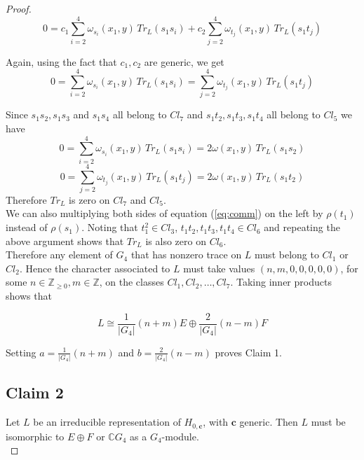 \documentclass[a4apper,10pt]{amsart}
\theoremstyle{definition}
\numberwithin{thm}{section}
\newcommand{\Z}{\mathbb{Z}}
\newcommand{\C}{\mathbb{C}}
\begin{document}
\begin{proof}
\begin{displaymath}
0 = c_1 \sum_{i = 2}^4 \omega_{s_i}(x_1,y) \, Tr_L(s_1s_i) + c_2 \sum_{j = 2}^4 \omega_{t_j} (x_1,y) \, Tr_L(s_1t_j)
\end{displaymath}

\noindent Again, using the fact that $c_1, c_2$ are generic, we get  
\begin{displaymath}
0 = \sum_{i = 2}^4 \omega_{s_i}(x_1,y) \, Tr_L(s_1s_i) = \sum_{j = 2}^4 \omega_{t_j}(x_1,y) \, Tr_L(s_1t_j) 
\end{displaymath}

\noindent Since $s_1s_2, s_1s_3$ and $s_1s_4$ all belong to $Cl_7$ and $s_1t_2, s_1t_3,s_1t_4$ all belong to $Cl_5$ we have 
\begin{displaymath}
0 = \sum_{i = 2}^4 \omega_{s_i}(x_1,y)\, Tr_L(s_1s_i) = 2 \omega(x_1,y) \, Tr_L(s_1s_2)
\end{displaymath}
\begin{displaymath}
0 = \sum_{j = 2}^4 \omega_{t_j}(x_1,y) \, Tr_L(s_1t_j) = 2 \omega(x_1,y) \, Tr_L(s_1t_2)
\end{displaymath}
Therefore $Tr_L$ is zero on $Cl_7$ and $Cl_5$.\\
We can also multiplying both sides of equation (\ref{eq:comm}) on the left by $\rho(t_1)$ instead of $\rho(s_1)$. Noting that $t_1^2 \in Cl_3$, $t_1t_2,t_1t_3,t_1t_4 \in Cl_6$ and repeating the above argument shows that $Tr_L$ is also zero on $Cl_6$.\\

\noindent Therefore any element of $G_4$ that has nonzero trace on $L$ must belong to $Cl_1$ or $Cl_2$. Hence the character associated to $L$ must take values $(n,m,0,0,0,0,0)$, for some $n \in \Z_{\ge 0}, m \in \Z$, on the classes $Cl_1, Cl_2, \dots , Cl_7$. Taking inner products shows that

\begin{displaymath}
L \cong \frac{1}{|G_4|}(n + m) E \oplus \frac{2}{|G_4|}(n - m)F
\end{displaymath}

\noindent Setting $a = \frac{1}{|G_4|}(n + m)$ and $b = \frac{2}{|G_4|}(n - m)$ proves Claim 1. \\

\subsection*{Claim 2} Let $L$ be an irreducible representation of $H_{0,\mathbf{c}}$, with $\mathbf{c}$ generic. Then $L$ must be isomorphic to $E \oplus F$ or $\C G_4$ as a $G_4$-module.\\


\end{proof}
\end{document}

